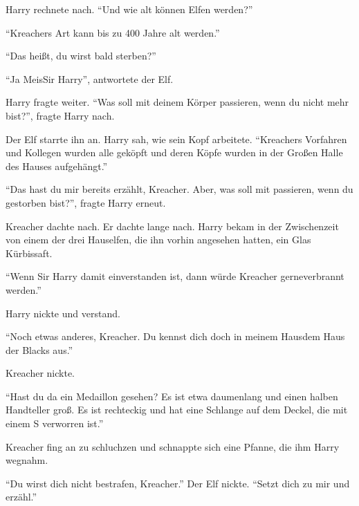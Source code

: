 Harry rechnete nach.  \enquote{Und wie alt können Elfen werden?}

\enquote{Kreachers Art kann bis zu 400 Jahre alt werden.}

\enquote{Das heißt, du wirst bald sterben?}

\enquote{Ja Meis\gst Sir Harry}, antwortete der Elf.

Harry fragte weiter. \enquote{Was soll mit deinem Körper passieren, wenn du nicht mehr bist?}, fragte Harry nach.

Der Elf starrte ihn an. Harry sah, wie sein Kopf arbeitete. \enquote{Kreachers Vorfahren und Kollegen wurden alle geköpft und deren Köpfe wurden in der Großen Halle des Hauses aufgehängt.}

\enquote{Das hast du mir bereits erzählt, Kreacher. Aber, was soll mit  passieren, wenn du gestorben bist?}, fragte Harry erneut.

Kreacher dachte nach. Er dachte lange nach. Harry bekam in der Zwischenzeit von einem der drei Hauselfen, die ihn vorhin angesehen hatten, ein Glas Kürbissaft.

\enquote{Wenn Sir Harry damit einverstanden ist, dann würde Kreacher gerne\abs verbrannt werden.}

Harry nickte und verstand.

\enquote{Noch etwas anderes, Kreacher. Du kennst dich doch in meinem Haus\abs dem Haus der Blacks aus.}

Kreacher nickte.

\enquote{Hast du da ein Medaillon gesehen? Es ist etwa daumenlang und einen halben Handteller groß. Es ist rechteckig und hat eine Schlange auf dem Deckel, die mit einem S verworren ist.}

Kreacher fing an zu schluchzen und schnappte sich eine Pfanne, die ihm Harry wegnahm.

\enquote{Du wirst dich nicht bestrafen, Kreacher.} Der Elf nickte. \enquote{Setzt dich zu mir und erzähl.}


